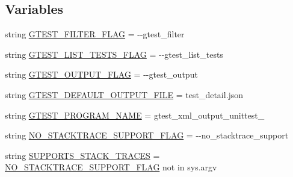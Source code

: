 \subsection*{Variables}
\begin{DoxyCompactItemize}
\item 
string \mbox{\hyperlink{namespacegoogletest-master_1_1googletest_1_1test_1_1googletest-json-output-unittest_ad7ef040e5c95d9ee51f736dbf7402959}{G\+T\+E\+S\+T\+\_\+\+F\+I\+L\+T\+E\+R\+\_\+\+F\+L\+AG}} = \textquotesingle{}-\/-\/gtest\+\_\+filter\textquotesingle{}
\item 
string \mbox{\hyperlink{namespacegoogletest-master_1_1googletest_1_1test_1_1googletest-json-output-unittest_adcc8031a2699c276ee560e0ee76623c4}{G\+T\+E\+S\+T\+\_\+\+L\+I\+S\+T\+\_\+\+T\+E\+S\+T\+S\+\_\+\+F\+L\+AG}} = \textquotesingle{}-\/-\/gtest\+\_\+list\+\_\+tests\textquotesingle{}
\item 
string \mbox{\hyperlink{namespacegoogletest-master_1_1googletest_1_1test_1_1googletest-json-output-unittest_a52faa0871539c6ad8503461b63144d21}{G\+T\+E\+S\+T\+\_\+\+O\+U\+T\+P\+U\+T\+\_\+\+F\+L\+AG}} = \textquotesingle{}-\/-\/gtest\+\_\+output\textquotesingle{}
\item 
string \mbox{\hyperlink{namespacegoogletest-master_1_1googletest_1_1test_1_1googletest-json-output-unittest_ad58ddefb1c8044331f8f4c02f408d155}{G\+T\+E\+S\+T\+\_\+\+D\+E\+F\+A\+U\+L\+T\+\_\+\+O\+U\+T\+P\+U\+T\+\_\+\+F\+I\+LE}} = \textquotesingle{}test\+\_\+detail.\+json\textquotesingle{}
\item 
string \mbox{\hyperlink{namespacegoogletest-master_1_1googletest_1_1test_1_1googletest-json-output-unittest_a56e69c0056fb25f174fbebad21790879}{G\+T\+E\+S\+T\+\_\+\+P\+R\+O\+G\+R\+A\+M\+\_\+\+N\+A\+ME}} = \textquotesingle{}gtest\+\_\+xml\+\_\+output\+\_\+unittest\+\_\+\textquotesingle{}
\item 
string \mbox{\hyperlink{namespacegoogletest-master_1_1googletest_1_1test_1_1googletest-json-output-unittest_afc770895691509ff74775d0f1b625e26}{N\+O\+\_\+\+S\+T\+A\+C\+K\+T\+R\+A\+C\+E\+\_\+\+S\+U\+P\+P\+O\+R\+T\+\_\+\+F\+L\+AG}} = \textquotesingle{}-\/-\/no\+\_\+stacktrace\+\_\+support\textquotesingle{}
\item 
string \mbox{\hyperlink{namespacegoogletest-master_1_1googletest_1_1test_1_1googletest-json-output-unittest_a4f2a16da5067932a6b44666b7b9710c0}{S\+U\+P\+P\+O\+R\+T\+S\+\_\+\+S\+T\+A\+C\+K\+\_\+\+T\+R\+A\+C\+ES}} = \mbox{\hyperlink{namespacegoogletest-master_1_1googletest_1_1test_1_1googletest-json-output-unittest_afc770895691509ff74775d0f1b625e26}{N\+O\+\_\+\+S\+T\+A\+C\+K\+T\+R\+A\+C\+E\+\_\+\+S\+U\+P\+P\+O\+R\+T\+\_\+\+F\+L\+AG}} not in sys.\+argv

\end{DoxyCompactItemize}
